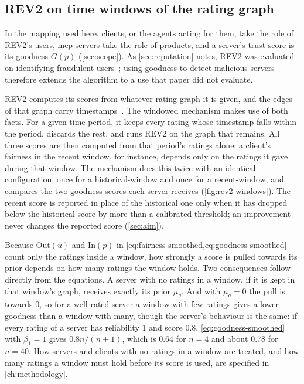 \subsection{REV2 on time windows of the rating graph}\label{sec:rev2-windows}

In the mapping used here, clients, or the agents acting for them, take the role of REV2's users, \gls{mcp} servers take the role of products, and a server's trust score is its goodness $G(p)$ (\cref{sec:scope}). As \cref{sec:reputation} notes, REV2 was evaluated on identifying fraudulent users~\cite[p.~333]{Kumar2018}; using goodness to detect malicious servers therefore extends the algorithm to a use that paper did not evaluate.

REV2 computes its scores from whatever \gls{rating-graph} it is given, and the edges of that graph carry timestamps~\cite[p.~333]{Kumar2018}. The windowed mechanism makes use of both facts. For a given time period, it keeps every rating whose timestamp falls within the period, discards the rest, and runs REV2 on the graph that remains. All three scores are then computed from that period's ratings alone: a client's fairness in the recent window, for instance, depends only on the ratings it gave during that window. The mechanism does this twice with an identical configuration, once for a \gls{historical-window} and once for a \gls{recent-window}, and compares the two goodness scores each server receives (\cref{fig:rev2-windows}). The recent score is reported in place of the historical one only when it has dropped below the historical score by more than a calibrated threshold; an improvement never changes the reported score (\cref{sec:aim}).

Because $\mathrm{Out}(u)$ and $\mathrm{In}(p)$ in \cref{eq:fairness-smoothed,eq:goodness-smoothed} count only the ratings inside a window, how strongly a score is pulled towards its prior depends on how many ratings the window holds. Two consequences follow directly from the equations. A server with no ratings in a window, if it is kept in that window's graph, receives exactly its prior $\mu_g$. And with $\mu_g = 0$ the pull is towards 0, so for a well-rated server a window with few ratings gives a lower goodness than a window with many, though the server's behaviour is the same: if every rating of a server has reliability 1 and score 0.8, \cref{eq:goodness-smoothed} with $\beta_1 = 1$ gives $0.8n/(n + 1)$, which is 0.64 for $n = 4$ and about 0.78 for $n = 40$. How servers and clients with no ratings in a window are treated, and how many ratings a window must hold before its score is used, are specified in \cref{ch:methodology}.

